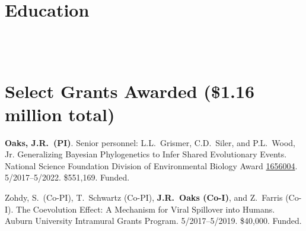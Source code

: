 
\section*{Education}
 \\
 \\

% 

% 

\section*{Select Grants Awarded (\$1.16 million total)}
% 
\myHangIndent
\textbf{Oaks, J.R.\ (PI)}.
Senior personnel: L.L.\ Grismer, C.D.\ Siler, and P.L.\ Wood, Jr.
Generalizing Bayesian Phylogenetics to Infer Shared Evolutionary Events.
National Science Foundation Division of Environmental Biology Award
\href{https://www.nsf.gov/awardsearch/showAward?AWD_ID=1656004&HistoricalAwards=false}{1656004}.
5/2017--5/2022.
\$551,169.
Funded.

\myHangIndent
Zohdy, S.\ (Co-PI), T.\ Schwartz (Co-PI), \textbf{J.R.\ Oaks (Co-I)}, and Z.\ Farris (Co-I).
The Coevolution Effect: A Mechanism for Viral Spillover into Humans.
Auburn University Intramural Grants Program.
5/2017--5/2019.
\$40,000.
Funded.


